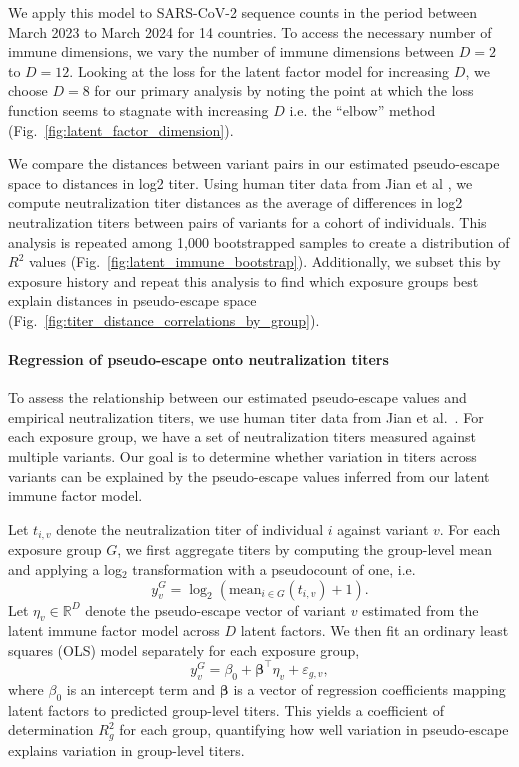\documentclass[11pt,oneside,letterpaper]{article}
\newcommand{\varEscape}{\eta}
\begin{document}
We apply this model to SARS-CoV-2 sequence counts in the period between March 2023 to March 2024 for 14 countries.
To access the necessary number of immune dimensions, we vary the number of immune dimensions between $D=2$ to $D=12$.
Looking at the loss for the latent factor model for increasing $D$, we choose $D=8$ for our primary analysis by noting the point at which the loss function seems to stagnate with increasing $D$ i.e. the ``elbow'' method (Fig.~\ref{fig:latent_factor_dimension}).

We compare the distances between variant pairs in our estimated pseudo-escape space to distances in log2 titer.
Using human titer data from Jian et al \cite{Jian2023}, we compute neutralization titer distances as the average of differences in log2 neutralization titers between pairs of variants for a cohort of individuals.
This analysis is repeated among 1,000 bootstrapped samples to create a distribution of $R^2$ values (Fig.~\ref{fig:latent_immune_bootstrap}).
Additionally, we subset this by exposure history and repeat this analysis to find which exposure groups best explain distances in pseudo-escape space (Fig.~\ref{fig:titer_distance_correlations_by_group}).

\paragraph{Regression of pseudo-escape onto neutralization titers}

To assess the relationship between our estimated pseudo-escape values and empirical neutralization titers, we use human titer data from Jian et al.~\cite{Jian2023}.
For each exposure group, we have a set of neutralization titers measured against multiple variants.
Our goal is to determine whether variation in titers across variants can be explained by the pseudo-escape values inferred from our latent immune factor model.

Let $t_{i,v}$ denote the neutralization titer of individual $i$ against variant $v$.
For each exposure group $G$, we first aggregate titers by computing the group-level mean and applying a log$_2$ transformation with a pseudocount of one, i.e.
\begin{equation}
    y_{v}^G = \log_2\left(\mathrm{mean}_{i \in G}(t_{i,v}) + 1\right).
\end{equation}
Let $\varEscape_v \in \mathbb{R}^D$ denote the pseudo-escape vector of variant $v$ estimated from the latent immune factor model across $D$ latent factors.
We then fit an ordinary least squares (OLS) model separately for each exposure group,
\begin{equation}
    y_{v}^G = \beta_0 + \boldsymbol{\beta}^\top \varEscape_v + \varepsilon_{g,v},
\end{equation}
where $\beta_0$ is an intercept term and $\boldsymbol{\beta}$ is a vector of regression coefficients mapping latent factors to predicted group-level titers.
This yields a coefficient of determination $R^2_g$ for each group, quantifying how well variation in pseudo-escape explains variation in group-level titers.
\end{document}
